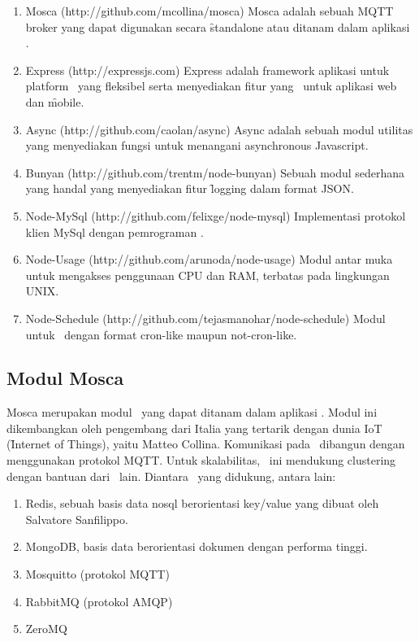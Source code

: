 \begin{enumerate}
    \item Mosca (http://github.com/mcollina/mosca)
			Mosca adalah sebuah MQTT broker yang dapat digunakan secara \f{standalone}
			atau ditanam dalam aplikasi \nodejs.
    \item Express (http://expressjs.com)
      Express adalah framework aplikasi untuk platform \nodejs~yang fleksibel
      serta menyediakan fitur yang \robust~untuk aplikasi web dan \f{mobile}.
    \item Async (http://github.com/caolan/async)
			Async adalah sebuah modul utilitas yang menyediakan fungsi untuk menangani
			asynchronous Javascript.
    \item Bunyan (http://github.com/trentm/node-bunyan)
			Sebuah modul sederhana yang handal yang menyediakan fitur \f{logging}
			dalam format JSON.
		\item Node-MySql (http://github.com/felixge/node-mysql)
			Implementasi protokol klien MySql dengan pemrograman \nodejs.
		\item Node-Usage (http://github.com/arunoda/node-usage)
			Modul antar muka untuk mengakses penggunaan CPU dan RAM, terbatas pada
			lingkungan UNIX.
		\item Node-Schedule (http://github.com/tejasmanohar/node-schedule)
			Modul untuk \scheduler~dengan format cron-like maupun not-cron-like.
\end{enumerate}


\subsection{Modul Mosca}

Mosca merupakan modul \broker~yang dapat ditanam dalam aplikasi \nodejs. Modul
ini dikembangkan oleh pengembang dari Italia yang tertarik dengan dunia IoT
(\f{Internet of Things}), yaitu Matteo Collina. Komunikasi pada \broker~dibangun
dengan menggunakan protokol MQTT. Untuk skalabilitas, \broker~ini mendukung
clustering dengan bantuan dari \broker~lain. Diantara \broker~yang didukung,
antara lain:

\begin{enumerate}
    \item Redis, sebuah basis data nosql berorientasi key/value yang dibuat oleh
			Salvatore Sanfilippo.
    \item MongoDB, basis data berorientasi dokumen dengan performa tinggi.
    \item Mosquitto (protokol MQTT)
		\item RabbitMQ (protokol AMQP)
		\item ZeroMQ
\end{enumerate}


